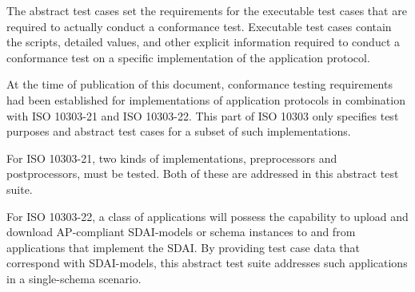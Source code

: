     The abstract test cases set the requirements for the
executable test cases that are required to actually conduct
a conformance test. Executable test cases contain the scripts,
detailed values, and other explicit information required to
conduct a conformance test on a specific implementation of
the application protocol.

    At the time of publication of this document, conformance
testing requirements had been established for implementations
of application protocols in combination with ISO 10303-21 and
ISO 10303-22. This part of ISO 10303 only specifies
test purposes and abstract test cases for a subset of such
implementations.

    For ISO 10303-21, two kinds of implementations, preprocessors and
postprocessors, must be tested. Both of these are addressed in this
abstract test suite.

    For ISO 10303-22, a class of applications will possess the capability
to upload and download AP-compliant SDAI-models or schema instances
to and from applications that implement the SDAI. By providing test case
data that correspond with SDAI-models, this abstract test suite addresses
such applications in a single-schema scenario.

\endinput
